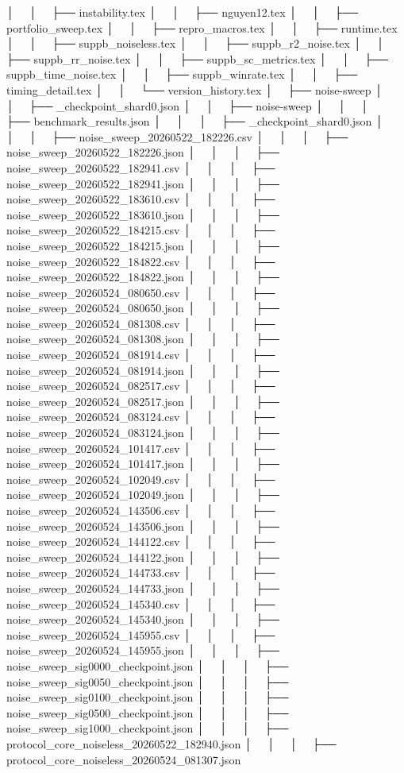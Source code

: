 │   │       ├── instability.tex
│   │       ├── nguyen12.tex
│   │       ├── portfolio_sweep.tex
│   │       ├── repro_macros.tex
│   │       ├── runtime.tex
│   │       ├── suppb_noiseless.tex
│   │       ├── suppb_r2_noise.tex
│   │       ├── suppb_rr_noise.tex
│   │       ├── suppb_sc_metrics.tex
│   │       ├── suppb_time_noise.tex
│   │       ├── suppb_winrate.tex
│   │       ├── timing_detail.tex
│   │       └── version_history.tex
│   ├── noise-sweep
│   │   ├── _checkpoint_shard0.json
│   │   ├── noise-sweep
│   │   │   ├── benchmark_results.json
│   │   │   ├── _checkpoint_shard0.json
│   │   │   ├── noise_sweep_20260522_182226.csv
│   │   │   ├── noise_sweep_20260522_182226.json
│   │   │   ├── noise_sweep_20260522_182941.csv
│   │   │   ├── noise_sweep_20260522_182941.json
│   │   │   ├── noise_sweep_20260522_183610.csv
│   │   │   ├── noise_sweep_20260522_183610.json
│   │   │   ├── noise_sweep_20260522_184215.csv
│   │   │   ├── noise_sweep_20260522_184215.json
│   │   │   ├── noise_sweep_20260522_184822.csv
│   │   │   ├── noise_sweep_20260522_184822.json
│   │   │   ├── noise_sweep_20260524_080650.csv
│   │   │   ├── noise_sweep_20260524_080650.json
│   │   │   ├── noise_sweep_20260524_081308.csv
│   │   │   ├── noise_sweep_20260524_081308.json
│   │   │   ├── noise_sweep_20260524_081914.csv
│   │   │   ├── noise_sweep_20260524_081914.json
│   │   │   ├── noise_sweep_20260524_082517.csv
│   │   │   ├── noise_sweep_20260524_082517.json
│   │   │   ├── noise_sweep_20260524_083124.csv
│   │   │   ├── noise_sweep_20260524_083124.json
│   │   │   ├── noise_sweep_20260524_101417.csv
│   │   │   ├── noise_sweep_20260524_101417.json
│   │   │   ├── noise_sweep_20260524_102049.csv
│   │   │   ├── noise_sweep_20260524_102049.json
│   │   │   ├── noise_sweep_20260524_143506.csv
│   │   │   ├── noise_sweep_20260524_143506.json
│   │   │   ├── noise_sweep_20260524_144122.csv
│   │   │   ├── noise_sweep_20260524_144122.json
│   │   │   ├── noise_sweep_20260524_144733.csv
│   │   │   ├── noise_sweep_20260524_144733.json
│   │   │   ├── noise_sweep_20260524_145340.csv
│   │   │   ├── noise_sweep_20260524_145340.json
│   │   │   ├── noise_sweep_20260524_145955.csv
│   │   │   ├── noise_sweep_20260524_145955.json
│   │   │   ├── noise_sweep_sig0000_checkpoint.json
│   │   │   ├── noise_sweep_sig0050_checkpoint.json
│   │   │   ├── noise_sweep_sig0100_checkpoint.json
│   │   │   ├── noise_sweep_sig0500_checkpoint.json
│   │   │   ├── noise_sweep_sig1000_checkpoint.json
│   │   │   ├── protocol_core_noiseless_20260522_182940.json
│   │   │   ├── protocol_core_noiseless_20260524_081307.json
